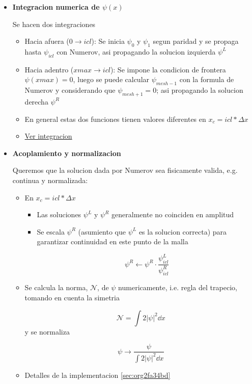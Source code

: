 \documentclass[11pt]{article}
\begin{document}
\begin{itemize}
\item \textbf{Integracion numerica de \(\psi(x)\)}

Se hacen dos integraciones

\begin{itemize}
\item Hacia afuera (\(0 \to icl\)): Se inicia \(\psi_0\) y \(\psi_1\) segun paridad y se propaga hasta \(\psi_{icl}\) con Numerov, asi propagando la solucion izquierda \(\psi^L\)

\item Hacia adentro (\(xmax \to icl\)): Se impone la condicion de frontera \(\psi(xmax) = 0\), luego se puede calcular \(\psi_{mesh -1}\) con la formula de Numerov y considerando que \(\psi_{mesh+1} = 0\); asi propagando la solucion derecha \(\psi^R\)

\item En general estas dos funciones tienen valores diferentes en \(x_c = icl * \Delta x\)

\item \hyperref[sec:orgff92265]{Ver integracion}
\end{itemize}

\item \textbf{Acoplamiento y normalizacion}

Queremos que la solucion dada por Numerov sea fisicamente valida, e.g. continua y normalizada:

\begin{itemize}
\item En \(x_c = icl * \Delta x\)
\begin{itemize}
\item Las soluciones \(\psi^L\) y \(\psi^R\) generalmente no coinciden en amplitud

\item Se escala \(\psi^R\) (asumiento que \(\psi^L\) es la solucion correcta) para garantizar continuidad en este punto de la malla

\[ \psi^{R} \leftarrow \psi^{R} \cdot \frac{\psi^{L}_{icl}}{\psi^{R}_{icl}} \]
\end{itemize}

\item Se calcula la norma, \(\mathcal{N}\), de \(\psi\) numericamente, i.e. regla del trapecio, tomando en cuenta la simetria

\[ \mathcal{N} = \int 2|\psi|^2 \dd{x} \]
y se normaliza

\[ \psi \to \frac{\psi}{\int 2|\psi|^2 \dd{x}} \]

\item Detalles de la implementacion \ref{sec:org2fa34bd}
\end{itemize}


\end{itemize}
\end{document}
